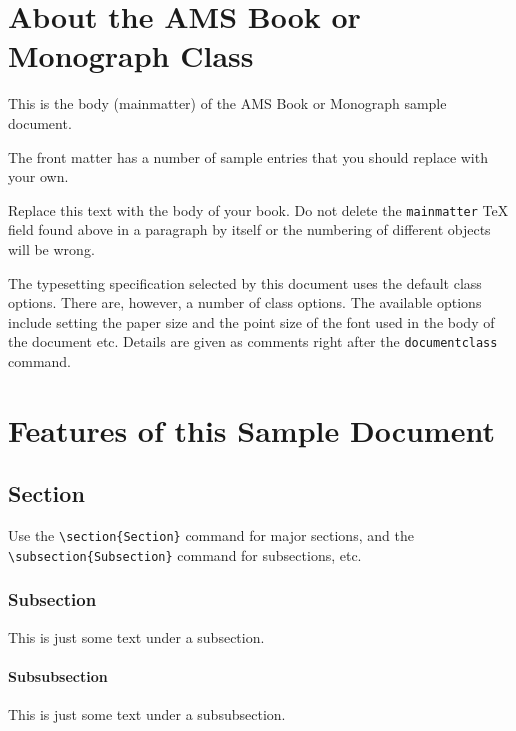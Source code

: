 \chapter{About the AMS Book or Monograph Class}

This is the body (mainmatter) of the AMS Book or Monograph sample
document.

The front matter has a number of sample entries that you should
replace with your own.

Replace this text with the body of your book. Do not delete the
\verb|mainmatter| TeX field found above in a paragraph by itself
or the numbering of different objects will be wrong.

The typesetting specification selected by this document uses the
default class options. There are, however, a number of class
options. The available options include setting the paper size and
the point size of the font used in the body of the document etc.
Details are given as comments right after the \verb|documentclass|
command.

\chapter{Features of this Sample Document}

\section{Section}

Use the \verb"\section{Section}" command for major sections, and
the \verb"\subsection{Subsection}" command for subsections, etc.

\subsection{Subsection}

This is just some text under a subsection.

\subsubsection{Subsubsection}

This is just some text under a subsubsection.

